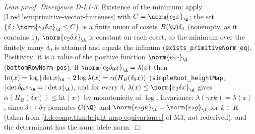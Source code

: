 \begin{proof}[Lean proof]
\emph{Divergence D-L1-3.} Existence of the minimum: apply \cref{I.red.lem:primitive-vector-finiteness} with $C=\norm{e_2x}_\A$; the set $\{\delta:\norm{e_2\delta x}_\A\le C\}$ is a finite union of cosets $B(\Q)\delta_0$ (nonempty, as it contains $1$), $\norm{e_2\delta x}_\A$ is constant on each coset, so the minimum over the finitely many $\delta_0$ is attained and equals the infimum (\texttt{exists\_primitiveNorm\_eq}). Positivity: it is a value of the positive function $\norm{e_2\,\cdot}_\A$ (\texttt{bottomRowNorm\_pos}). If $\norm{e_2\delta_0x}_\A=\lambda(x)$ then $\mathrm{ht}(x)=\log|\det x|_\A-2\log\lambda(x)=\alpha(H_B(\delta_0x))$ (\texttt{simpleRoot\_heightMap}, $|\det\delta_0x|_\A=|\det x|_\A$), and for every $\delta$, $\lambda(x)\le\norm{e_2\delta x}_\A$ gives $\alpha(H_B(\delta x))\le\mathrm{ht}(x)$ by monotonicity of $\log$. Invariance: $\lambda(\gamma xk)=\lambda(x)$, since $\delta\mapsto\delta\gamma$ permutes $G(\Q)$ and $\norm{e_2gk}_\A=\norm{e_2g}_\A$ for $k\in K$ (taken from \cref{I.decomp.thm:height-map-equivariance} of M3, not rederived), and the determinant has the same idele norm.
\end{proof}

